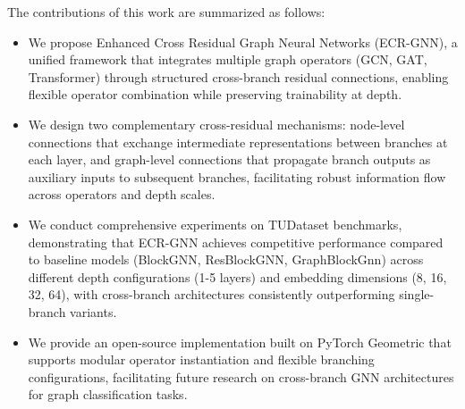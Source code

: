 The contributions of this work are summarized as follows:

\begin{itemize}
    \item We propose Enhanced Cross Residual Graph Neural Networks (ECR-GNN), a unified framework that integrates multiple graph operators (GCN, GAT, Transformer) through structured cross-branch residual connections, enabling flexible operator combination while preserving trainability at depth.
    \item We design two complementary cross-residual mechanisms: node-level connections that exchange intermediate representations between branches at each layer, and graph-level connections that propagate branch outputs as auxiliary inputs to subsequent branches, facilitating robust information flow across operators and depth scales.
    \item We conduct comprehensive experiments on TUDataset benchmarks, demonstrating that ECR-GNN achieves competitive performance compared to baseline models (BlockGNN, ResBlockGNN, GraphBlockGnn) across different depth configurations (1-5 layers) and embedding dimensions (8, 16, 32, 64), with cross-branch architectures consistently outperforming single-branch variants.
    \item We provide an open-source implementation built on PyTorch Geometric that supports modular operator instantiation and flexible branching configurations, facilitating future research on cross-branch GNN architectures for graph classification tasks.
\end{itemize}
